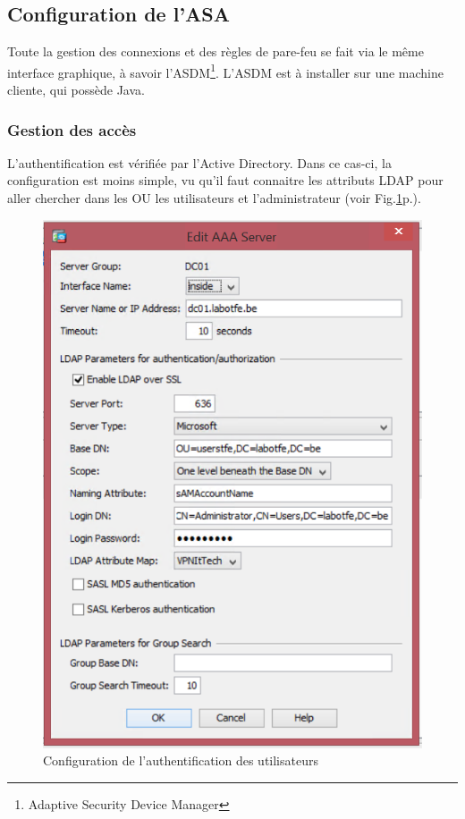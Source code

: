 \subsection{Configuration de l'ASA}
Toute la gestion des connexions et des règles de pare-feu se fait via le même interface graphique, à savoir l'ASDM\footnote{Adaptive Security Device Manager}.
L'ASDM est à installer sur une machine cliente, qui possède Java.

\subsubsection{Gestion des accès}
L'authentification est vérifiée par l'Active Directory. 
Dans ce cas-ci, la configuration est moins simple, vu qu'il faut connaitre les attributs LDAP pour aller chercher dans les OU les utilisateurs et l'administrateur (voir Fig.\ref{fig:authCisco}p.\pageref{fig:authCisco}).
\begin{figure}[ht]
	\centering
	\includegraphics{Cisco/AAA-Ldap.png}
	\caption{Configuration de l'authentification des utilisateurs}
	\label{fig:authCisco}
\end{figure}

